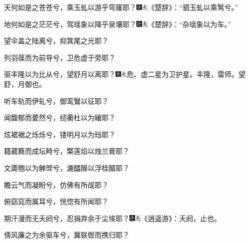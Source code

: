 天何如是之苍苍兮，乘玉虬以游乎穹窿耶？{{\includegraphics[width=3mm]{../Images/00004}\includegraphics[width=3mm]{../Images/00012}\footnotesize \kaishu 《楚辞》：``驷玉虬以乘}鹥{兮。''}}

地何如是之茫茫兮，驾瑶象以降乎泉壤耶？{\includegraphics[width=3mm]{../Images/00004}\includegraphics[width=3mm]{../Images/00012}\footnotesize \kaishu 《楚辞》：``杂瑶象以为车。''}

望伞盖之陆离兮，抑箕尾之光耶？

列羽葆而为前导兮，卫危虚于旁耶？

驱丰隆以为比从兮，望舒月以离耶？{\includegraphics[width=3mm]{../Images/00004}\includegraphics[width=3mm]{../Images/00012}\footnotesize \kaishu 危、虚二星为卫护星。丰隆，雷师。望舒，月御也。}

听车轨而伊轧兮，御鸾鷖以征耶？

闻馥郁而薆然兮，纫蘅杜以为纕耶？

炫裙裾之烁烁兮，镂明月以为珰耶？

籍葳蕤而成坛畤兮，檠莲焰以烛兰膏耶？

文瓟匏以为觯斝兮，漉醽醁以浮桂醑耶？

瞻云气而凝盼兮，仿佛有所觇耶？

俯窈窕而属耳兮，恍惚有所闻耶？

期汗漫而无夭阏兮，忍捐弃余于尘埃耶？{\includegraphics[width=3mm]{../Images/00004}\includegraphics[width=3mm]{../Images/00012}\footnotesize \kaishu 《逍遥游》：夭阏，止也。}

倩风廉之为余驱车兮，冀联辔而携归耶？

